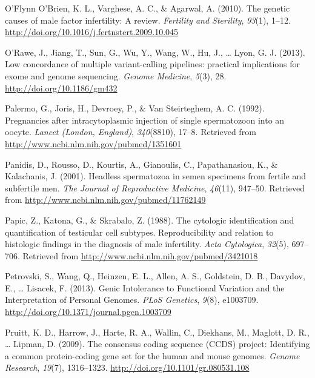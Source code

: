 \documentclass[12pt,twoside]{reedthesis}
\theoremstyle{definition}
\theoremstyle{definition}
\theoremstyle{remark}
\begin{document}
  \hypertarget{ref-OFlynnOBrien2010}{}
  O'Flynn O'Brien, K. L., Varghese, A. C., \& Agarwal, A. (2010). The
  genetic causes of male factor infertility: A review. \emph{Fertility and
  Sterility}, \emph{93}(1), 1--12.
  \url{http://doi.org/10.1016/j.fertnstert.2009.10.045}
  
  \hypertarget{ref-ORawe2013}{}
  O'Rawe, J., Jiang, T., Sun, G., Wu, Y., Wang, W., Hu, J., \ldots{} Lyon,
  G. J. (2013). Low concordance of multiple variant-calling pipelines:
  practical implications for exome and genome sequencing. \emph{Genome
  Medicine}, \emph{5}(3), 28. \url{http://doi.org/10.1186/gm432}
  
  \hypertarget{ref-Palermo1992}{}
  Palermo, G., Joris, H., Devroey, P., \& Van Steirteghem, A. C. (1992).
  Pregnancies after intracytoplasmic injection of single spermatozoon into
  an oocyte. \emph{Lancet (London, England)}, \emph{340}(8810), 17--8.
  Retrieved from \url{http://www.ncbi.nlm.nih.gov/pubmed/1351601}
  
  \hypertarget{ref-Panidis2001}{}
  Panidis, D., Rousso, D., Kourtis, A., Gianoulis, C., Papathanasiou, K.,
  \& Kalachanis, J. (2001). Headless spermatozoa in semen specimens from
  fertile and subfertile men. \emph{The Journal of Reproductive Medicine},
  \emph{46}(11), 947--50. Retrieved from
  \url{http://www.ncbi.nlm.nih.gov/pubmed/11762149}
  
  \hypertarget{ref-Papic}{}
  Papic, Z., Katona, G., \& Skrabalo, Z. (1988). The cytologic
  identification and quantification of testicular cell subtypes.
  Reproducibility and relation to histologic findings in the diagnosis of
  male infertility. \emph{Acta Cytologica}, \emph{32}(5), 697--706.
  Retrieved from \url{http://www.ncbi.nlm.nih.gov/pubmed/3421018}
  
  \hypertarget{ref-Petrovski2013}{}
  Petrovski, S., Wang, Q., Heinzen, E. L., Allen, A. S., Goldstein, D. B.,
  Davydov, E., \ldots{} Lisacek, F. (2013). Genic Intolerance to
  Functional Variation and the Interpretation of Personal Genomes.
  \emph{PLoS Genetics}, \emph{9}(8), e1003709.
  \url{http://doi.org/10.1371/journal.pgen.1003709}
  
  \hypertarget{ref-Pruitt2009}{}
  Pruitt, K. D., Harrow, J., Harte, R. A., Wallin, C., Diekhans, M.,
  Maglott, D. R., \ldots{} Lipman, D. (2009). The consensus coding
  sequence (CCDS) project: Identifying a common protein-coding gene set
  for the human and mouse genomes. \emph{Genome Research}, \emph{19}(7),
  1316--1323. \url{http://doi.org/10.1101/gr.080531.108}
  
\end{document}
